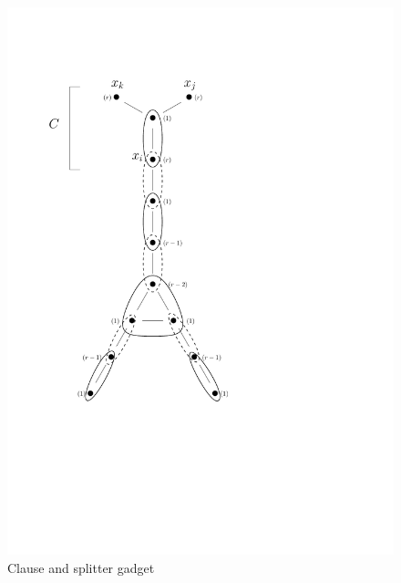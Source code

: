 \begin{figure}[htbp]
\begin{center}
\includegraphics[scale=.6]{figs/hardness}
\caption{Clause and splitter gadget}
\label{fig:3satconstruction}
\end{center}
\vspace{-5pt}
\end{figure}


